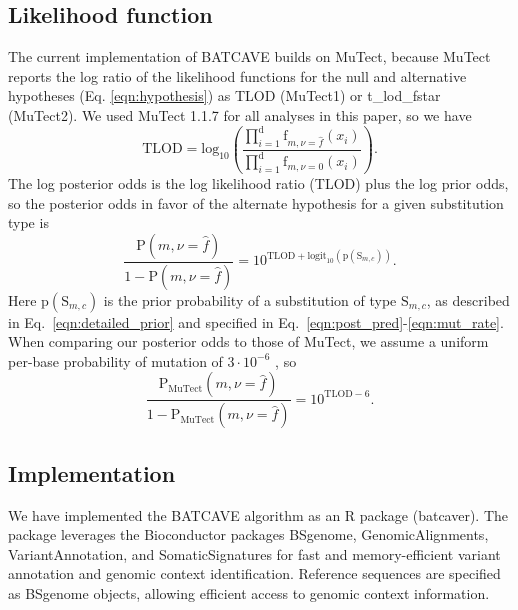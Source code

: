 \documentclass[a4,center,fleqn]{NAR}
\newcommand{\batcave}{BATCAVE }
\begin{document}
\subsection{Likelihood function}
The current implementation of \batcave builds on MuTect, because MuTect reports the log ratio of the likelihood functions for the null and alternative hypotheses (Eq. \ref{eqn:hypothesis}) as \textrm{TLOD} (MuTect1) or \textrm{t\_lod\_fstar} (MuTect2).
We used MuTect 1.1.7 for all analyses in this paper, so we have
\begin{equation}
  \label{eqn:tlod}
    \mathrm{TLOD} = \mathrm{log}_{10}\left(\frac{\prod_{i=1}^{\mathrm{d}} \textrm{f}_{m,\nu = \hat{f}}(x_i)}{\prod_{i=1}^{\mathrm{d}} \textrm{f}_{m,\nu = 0}(x_i)}\right).
\end{equation}
The log posterior odds is the log likelihood ratio (\textrm{TLOD}) plus the log prior odds, so the posterior odds in favor of the alternate hypothesis for a given substitution type is
\begin{equation}
  \label{eqn:computed_posterior}
  \frac{\mathrm{P}(m,\nu = \hat{f})}{1 - \mathrm{P}(m,\nu = \hat{f})} = 10^{\mathrm{TLOD} + \mathrm{logit}_{10}(\mathrm{p}(\mathrm{S}_{m,c}))}.
\end{equation}
Here $\mathrm{p}(\mathrm{S}_{m,c})$ is the prior probability of a substitution of type $\mathrm{S}_{m,c}$, as described in Eq.~\ref{eqn:detailed_prior} and specified in Eq.~\ref{eqn:post_pred}-\ref{eqn:mut_rate}.
When comparing our posterior odds to those of MuTect, we assume a uniform per-base probability of mutation of $3\cdot10^{-6}$ \cite{Cibulskis2013}, so
\begin{equation}  \label{eqn:mutect_posterior}
  \frac{\mathrm{P}_\mathrm{MuTect}(m,\nu = \hat{f})}{1 - \mathrm{P}_\mathrm{MuTect}(m,\nu = \hat{f})} = 10^{\mathrm{TLOD} - 6}.
\end{equation}

\subsection{Implementation}
We have implemented the \batcave algorithm as an R package (batcaver).
The package leverages the Bioconductor packages \textrm{BSgenome}, \textrm{GenomicAlignments}, \textrm{VariantAnnotation}, and \textrm{SomaticSignatures} for fast and memory-efficient variant annotation and genomic context identification. 
Reference sequences are specified as BSgenome objects, allowing efficient access to genomic context information.
\end{document}
